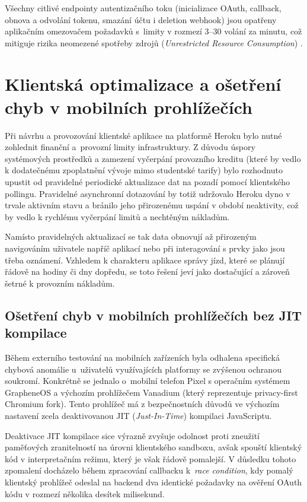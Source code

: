 \documentclass[male,czech,api_bc]{kitheses}
\begin{document}
Všechny citlivé endpointy autentizačního toku (inicializace OAuth, callback, obnova a odvolání tokenu, smazání účtu i deletion webhook) jsou opatřeny aplikačním omezovačem požadavků s~limity v rozmezí 3--30 volání za minutu, což mitiguje rizika neomezené spotřeby zdrojů (\textit{Unrestricted Resource Consumption}) \cite{Yalon2023API4}.

\section{Klientská optimalizace a ošetření chyb v mobilních prohlížečích} \label{sec:klientske_optimalizace}

Při návrhu a provozování klientské aplikace na platformě Heroku bylo nutné zohlednit finanční a~provozní limity infrastruktury. Z důvodu úspory systémových prostředků a zamezení vyčerpání provozního kreditu (které by vedlo k dodatečnému zpoplatnění vývoje mimo studentské tarify) bylo rozhodnuto upustit od pravidelné periodické aktualizace dat na pozadí pomocí klientského pollingu. Pravidelné asynchronní dotazování by totiž udržovalo Heroku dyno v trvale aktivním stavu a bránilo jeho přirozenému uspání v období neaktivity, což by vedlo k rychlému vyčerpání limitů a nechtěným nákladům.

Namísto pravidelných aktualizací se tak data obnovují až přirozeným navigováním uživatele napříč aplikací nebo při interagování s prvky jako jsou třeba oznámení. Vzhledem k charakteru aplikace správy jízd, které se plánují řádově na hodiny či dny dopředu, se toto řešení jeví jako dostačující a zároveň šetrné k provozním nákladům.

\subsection{Ošetření chyb v mobilních prohlížečích bez JIT kompilace}

Během externího testování na mobilních zařízeních byla odhalena specifická chybová anomálie u~uživatelů využívajících platformy se zvýšenou ochranou soukromí. Konkrétně se jednalo o~mobilní telefon Pixel s operačním systémem GrapheneOS a výchozím prohlížečem Vanadium (který reprezentuje privacy-first Chromium fork). Tento prohlížeč má z bezpečnostních důvodů ve výchozím nastavení zcela deaktivovanou JIT (\textit{Just-In-Time}) kompilaci JavaScriptu.

Deaktivace JIT kompilace sice výrazně zvyšuje odolnost proti zneužití paměťových zranitelností na úrovni klientského sandboxu, avšak spouští klientský kód v interpretačním režimu, který je však řádově pomalejší. V důsledku tohoto zpomalení docházelo během zpracování callbacku k~\textit{race condition}, kdy pomalý klientský prohlížeč odeslal na backend dva identické požadavky na ověření OAuth kódu v rozmezí několika desítek milisekund.
\end{document}

